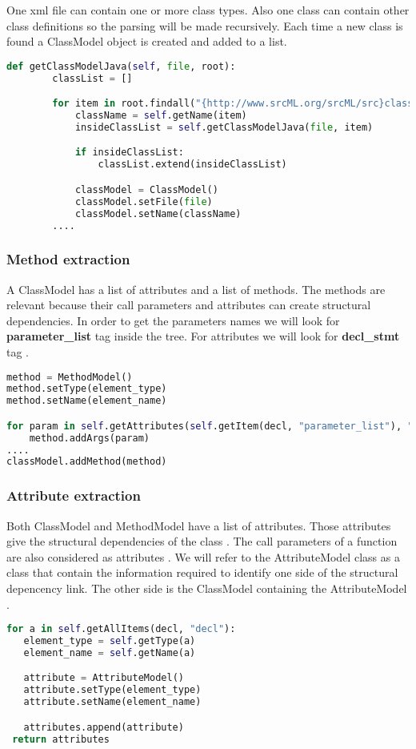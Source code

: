 \tab One xml file can contain one or more class types. Also one class can contain other class definitions so the parsing will be made recursively. Each time a new class is found a ClassModel object is created  and added to a list. 


\begin{lstlisting}[language=python, caption={Recursively find all the classes from XML file.}]
def getClassModelJava(self, file, root):
        classList = []

        for item in root.findall("{http://www.srcML.org/srcML/src}class"):
            className = self.getName(item)
            insideClassList = self.getClassModelJava(file, item)

            if insideClassList:
                classList.extend(insideClassList)

            classModel = ClassModel()
            classModel.setFile(file)
            classModel.setName(className)
		....
\end{lstlisting}

\subsubsection{Method extraction}
A ClassModel has a list of attributes and a list of methods. The methods are relevant because their call parameters and attributes can create structural dependencies. In order to get the parameters names we will look for \textbf{parameter\_list} tag inside the tree. For attributes we will look for \textbf{decl\_stmt} tag .
\begin{lstlisting}[language=python, caption={Get the parameter list of a method.}]
method = MethodModel()
method.setType(element_type)
method.setName(element_name)

for param in self.getAttributes(self.getItem(decl, "parameter_list"), "parameter"):
	method.addArgs(param)
....
classModel.addMethod(method)
\end{lstlisting}

\subsubsection{Attribute extraction}
Both ClassModel and MethodModel have a list of attributes.  Those attributes give the structural dependencies of the class . The call parameters of a function are also considered as attributes . We will refer to the AttributeModel class as a class that contain the information required to identify one side of the structural depencency link. The other side is the ClassModel containing the AttributeModel . 
\begin{lstlisting}[language=python, caption={Get the attributes list of a method or class.}]
for a in self.getAllItems(decl, "decl"):
   element_type = self.getType(a)
   element_name = self.getName(a)

   attribute = AttributeModel()
   attribute.setType(element_type)
   attribute.setName(element_name)

   attributes.append(attribute)
 return attributes
\end{lstlisting}


